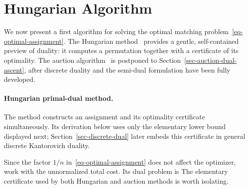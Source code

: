 \section{Hungarian Algorithm}

We now present a first algorithm for solving the optimal matching problem~\eqref{eq-optimal-assignment}. The Hungarian method~\cite{Kuhn1955,Burkard09} provides a gentle, self-contained preview of duality: it computes a permutation together with a certificate of its optimality. The auction algorithm~\cite{bertsekas1981new,bertsekas1992auction} is postponed to Section~\ref{sec-auction-dual-ascent}, after discrete duality and the semi-dual formulation have been fully developed.

\paragraph{Hungarian primal-dual method.}

The method constructs an assignment and its optimality certificate simultaneously. Its derivation below uses only the elementary lower bound displayed next; Section~\ref{sec-discrete-dual} later embeds this certificate in general discrete Kantorovich duality.

Since the factor $1/n$ in~\eqref{eq-optimal-assignment} does not affect the optimizer, work with the unnormalized total cost. Its dual problem is
The elementary certificate used by both Hungarian and auction methods is worth isolating.

